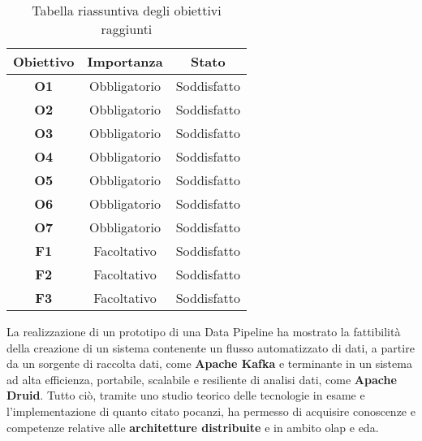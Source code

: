 \begin{table}[H]
    \centering
    \caption{Tabella riassuntiva degli obiettivi raggiunti}
    \label{tab:obiettivi_raggiunti}
    \begin{tabular}{|c|c|c|}
        \hline
        \textbf{Obiettivo} & \textbf{Importanza} & \textbf{Stato} \\\hline
        \textbf{O1} & Obbligatorio & Soddisfatto \\\hline
        \textbf{O2} & Obbligatorio & Soddisfatto\\\hline
        \textbf{O3} & Obbligatorio & Soddisfatto\\\hline
        \textbf{O4} & Obbligatorio & Soddisfatto \\ \hline
        \textbf{O5} & Obbligatorio & Soddisfatto \\\hline
        \textbf{O6} & Obbligatorio & Soddisfatto \\\hline
        \textbf{O7} & Obbligatorio & Soddisfatto \\\hline
        \textbf{F1} & Facoltativo & Soddisfatto\\\hline
        \textbf{F2} & Facoltativo & Soddisfatto \\\hline
        \textbf{F3} & Facoltativo & Soddisfatto\\\hline
    \end{tabular} 
\end{table}
\pagebreak
\noindent
La realizzazione di un prototipo di una \gls{Data Pipeline}{} ha mostrato la fattibilità della creazione di un sistema contenente un flusso automatizzato
di dati, a partire da un sorgente di raccolta dati, come \textbf{Apache Kafka} e terminante in un sistema ad alta efficienza, portabile, scalabile e resiliente di analisi dati, come \textbf{Apache Druid}.
Tutto ciò, tramite uno studio teorico delle tecnologie in esame e l'implementazione di quanto citato pocanzi, ha permesso di 
acquisire conoscenze e competenze relative alle \textbf{architetture distribuite} e in ambito \gls{olap}{} e \gls{eda}{}.  
